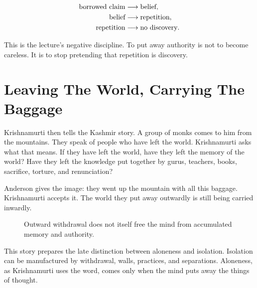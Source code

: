 \begin{align}
\hbox{borrowed claim} &\longrightarrow \hbox{belief},\\
\hbox{belief} &\longrightarrow \hbox{repetition},\\
\hbox{repetition} &\longrightarrow \hbox{no discovery}.
\end{align}

This is the lecture's negative discipline. To put away authority is not to become careless. It is to stop pretending that repetition is discovery.

\section{Leaving The World, Carrying The Baggage}

Krishnamurti then tells the Kashmir story. A group of monks comes to him from the mountains. They speak of people who have left the world. Krishnamurti asks what that means. If they have left the world, have they left the memory of the world? Have they left the knowledge put together by gurus, teachers, books, sacrifice, torture, and renunciation?

Anderson gives the image: they went up the mountain with all this baggage. Krishnamurti accepts it. The world they put away outwardly is still being carried inwardly.

\begin{figure}
\centering
{}
\caption{Outward withdrawal does not itself free the mind from accumulated memory and authority.}
\end{figure}

This story prepares the late distinction between aloneness and isolation. Isolation can be manufactured by withdrawal, walls, practices, and separations. Aloneness, as Krishnamurti uses the word, comes only when the mind puts away the things of thought.

